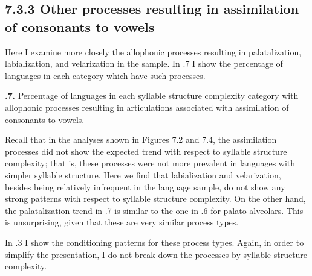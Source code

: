 \subsection{7.3.3 Other processes resulting in assimilation of consonants to vowels}

  Here I examine more closely the allophonic processes resulting in palatalization, labialization, and velarization in the sample. In .7 I show the percentage of languages in each category which have such processes.





\textbf{.7.} Percentage of languages in each syllable structure complexity category with allophonic processes resulting in articulations associated with assimilation of consonants to vowels.



  Recall that in the analyses shown in Figures 7.2 and 7.4, the assimilation processes did not show the expected trend with respect to syllable structure complexity; that is, these processes were not more prevalent in languages with simpler syllable structure. Here we find that labialization and velarization, besides being relatively infrequent in the language sample, do not show any strong patterns with respect to syllable structure complexity. On the other hand, the palatalization trend in .7 is similar to the one in .6 for palato-alveolars. This is unsurprising, given that these are very similar process types.



  In .3 I show the conditioning patterns for these process types. Again, in order to simplify the presentation, I do not break down the processes by syllable structure complexity.






